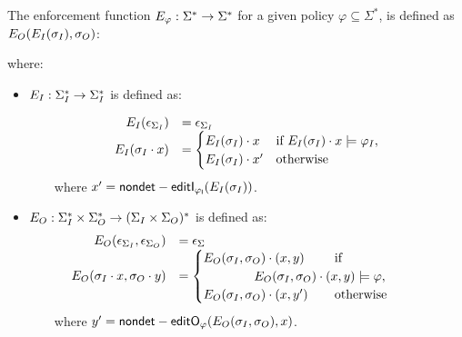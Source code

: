 \begin{definition}
	\label{def-func-E} The enforcement function $E_{\varphi}: \Sigma^* \rightarrow \Sigma^*$ for a given policy $\varphi\subseteq\Sigma^*$, is defined as $E_{O}(E_{I}(\sigma_I), \sigma_O)$:
	
	
	where:
	\begin{itemize}
		\item $E_{I}: \Sigma_I^* \rightarrow \Sigma_I^* $ is defined as:
		
		
		\[
		\begin{array}{rll}
			E_{I}(\epsilon_{\Sigma_I})& = \epsilon_{\Sigma_I} \\
			
			E_{I}(\sigma_I \cdot x) & =
			\begin{cases}
				E_{I}(\sigma_I) \cdot x &
				\mbox{if}\ E_{I}(\sigma_I)\cdot x \models \varphi_I,  \\
				E_{I}(\sigma_I) \cdot x' & \text{otherwise}
			\end{cases}
		\end{array}
		\]
		~~~~where $x'= \mathsf{{nondet}-editI_{\varphi_{I}}}(E_{I}(\sigma_I))$.
		
		\item $E_{O}: \Sigma^*_I \times \Sigma^*_O \rightarrow (\Sigma_I \times \Sigma_O)^*$ is defined as:
		\[
		\begin{array}{rll}
			\efo(\epsilon_{\Sigma_I}, \epsilon_{\Sigma_O})& = \epsilon_\Sigma\\
			\hspace{-2em}\efo(\sigma_I \cdot x, \sigma_O \cdot y) & =
			\begin{cases}
				\efo(\sigma_I, \sigma_O) \cdot (x,y) &\hspace{-5em}
				\mbox{if} \\
				~~~~~~~~~~~~\efo(\sigma_I, \sigma_O)\cdot(x,y)\models\varphi, & \\
				\efo(\sigma_I,\sigma_O) \cdot (x, y') &\hspace{-5em} \text{otherwise}
			\end{cases}
		\end{array}
		\]
		~~~~where $y'= \mathsf{{nondet}-editO_{\varphi}}(E_{O}(\sigma_I,\sigma_O), x)$.
		
	\end{itemize}
\end{definition}
